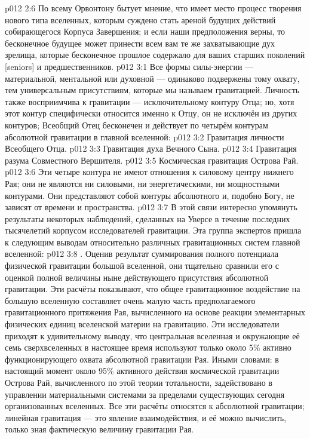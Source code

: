 \vs p012 2:6 По всему Орвонтону бытует мнение, что имеет место процесс творения нового типа вселенных, которым суждено стать ареной будущих действий собирающегося Корпуса Завершения; и если наши предположения верны, то бесконечное будущее может принести всем вам те же захватывающие дух зрелища, которые бесконечное прошлое содержало для ваших старших поколений [seniors] и предшественников.
\vs p012 3:1 Все формы силы\hyp{}энергии --- материальной, ментальной или духовной --- одинаково подвержены тому охвату, тем универсальным присутствиям, которые мы называем гравитацией. Личность также восприимчива к гравитации --- исключительному контуру Отца; но, хотя этот контур специфически относится именно к Отцу, он не исключён из других контуров; Всеобщий Отец бесконечен и действует по  четырём контурам абсолютной гравитации в главной вселенной:
\vs p012 3:2 Гравитация личности Всеобщего Отца.
\vs p012 3:3 Гравитация духа Вечного Сына.
\vs p012 3:4 Гравитация разума Совместного Вершителя.
\vs p012 3:5 Космическая гравитация Острова Рай.
\vs p012 3:6 \pc Эти четыре контура не имеют отношения к силовому центру нижнего Рая; они не являются ни силовыми, ни энергетическими, ни мощностными контурами. Они представляют собой контуры абсолютного  и, подобно Богу, не зависят от времени и пространства.
\vs p012 3:7 В этой связи интересно упомянуть результаты некоторых наблюдений, сделанных на Уверсе в течение последних тысячелетий корпусом исследователей гравитации. Эта группа экспертов пришла к следующим выводам относительно различных гравитационных систем главной вселенной:
\vs p012 3:8 . Оценив результат суммирования полного потенциала физической гравитации большой вселенной, они тщательно сравнили его с оценкой полной величины ныне действующего присутствия абсолютной гравитации. Эти расчёты показывают, что общее гравитационное воздействие на большую вселенную составляет очень малую часть предполагаемого гравитационного притяжения Рая, вычисленного на основе реакции элементарных физических единиц вселенской материи на гравитацию. Эти исследователи приходят к удивительному выводу, что центральная вселенная и окружающие её семь сверхвселенных в настоящее время используют только около 5\% активно функционирующего охвата абсолютной гравитации Рая. Иными словами: в настоящий момент около 95\% активного действия космической гравитации Острова Рай, вычисленного по этой теории тотальности, задействовано в управлении материальными системами за пределами существующих сегодня организованных вселенных. Все эти расчёты относятся к абсолютной гравитации; линейная гравитация --- это явление взаимодействия, и её можно вычислить, только зная фактическую величину гравитации Рая.
